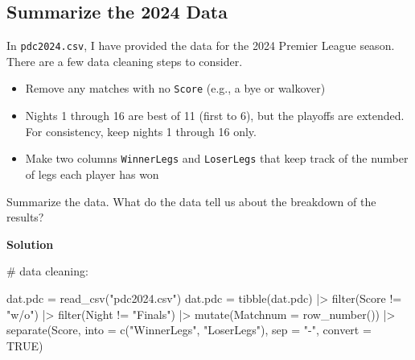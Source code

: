 \documentclass[
]{article}
\newenvironment{Shaded}{\begin{snugshade}}{\end{snugshade}}
\newcommand{\AttributeTok}[1]{\textcolor[rgb]{0.40,0.45,0.13}{#1}}
\newcommand{\CommentTok}[1]{\textcolor[rgb]{0.37,0.37,0.37}{#1}}
\newcommand{\ConstantTok}[1]{\textcolor[rgb]{0.56,0.35,0.01}{#1}}
\newcommand{\FunctionTok}[1]{\textcolor[rgb]{0.28,0.35,0.67}{#1}}
\newcommand{\NormalTok}[1]{\textcolor[rgb]{0.00,0.23,0.31}{#1}}
\newcommand{\OtherTok}[1]{\textcolor[rgb]{0.00,0.23,0.31}{#1}}
\newcommand{\SpecialCharTok}[1]{\textcolor[rgb]{0.37,0.37,0.37}{#1}}
\newcommand{\StringTok}[1]{\textcolor[rgb]{0.13,0.47,0.30}{#1}}
\providecommand{\tightlist}{%
  \setlength{\itemsep}{0pt}\setlength{\parskip}{0pt}}
\begin{document}
\subsection{Summarize the 2024 Data}\label{summarize-the-2024-data}

In \texttt{pdc2024.csv}, I have provided the data for the 2024 Premier
League season. There are a few data cleaning steps to consider.

\begin{itemize}
\tightlist
\item
  Remove any matches with no \texttt{Score} (e.g., a bye or walkover)
\item
  Nights 1 through 16 are best of 11 (first to 6), but the playoffs are
  extended. For consistency, keep nights 1 through 16 only.
\item
  Make two columns \texttt{WinnerLegs} and \texttt{LoserLegs} that keep
  track of the number of legs each player has won
\end{itemize}

Summarize the data. What do the data tell us about the breakdown of the
results?

\textbf{Solution}

\normalsize

\begin{Shaded}
\begin{Highlighting}[numbers=left,,]
\CommentTok{\# data cleaning:}

\NormalTok{dat.pdc }\OtherTok{=} \FunctionTok{read\_csv}\NormalTok{(}\StringTok{"pdc2024.csv"}\NormalTok{)}
\NormalTok{dat.pdc }\OtherTok{=} \FunctionTok{tibble}\NormalTok{(dat.pdc) }\SpecialCharTok{|\textgreater{}}
  \FunctionTok{filter}\NormalTok{(Score }\SpecialCharTok{!=} \StringTok{"w/o"}\NormalTok{) }\SpecialCharTok{|\textgreater{}}
  \FunctionTok{filter}\NormalTok{(Night }\SpecialCharTok{!=}  \StringTok{"Finals"}\NormalTok{) }\SpecialCharTok{|\textgreater{}}
  \FunctionTok{mutate}\NormalTok{(}\AttributeTok{Matchnum =} \FunctionTok{row\_number}\NormalTok{()) }\SpecialCharTok{|\textgreater{}}
  \FunctionTok{separate}\NormalTok{(Score, }\AttributeTok{into =} \FunctionTok{c}\NormalTok{(}\StringTok{"WinnerLegs"}\NormalTok{, }\StringTok{"LoserLegs"}\NormalTok{), }\AttributeTok{sep =} \StringTok{"{-}"}\NormalTok{, }\AttributeTok{convert =} \ConstantTok{TRUE}\NormalTok{)}
\end{Highlighting}
\end{Shaded}

\normalsize

\normalsize
\end{document}
